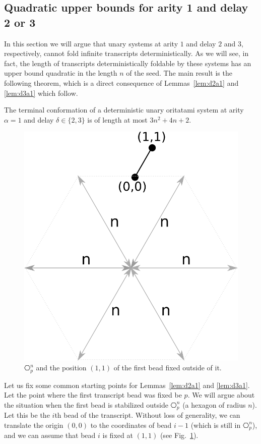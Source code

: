 

\subsection{Quadratic upper bounds for arity 1 and delay 2 or 3}
\label{sec:unary}

In this section we will argue that unary systems at arity $1$ and delay $2$ and $3$, respectively, cannot fold infinite transcripts deterministically. As we will see, in fact, the length of transcripts deterministically foldable by these systems has an upper bound quadratic in the length $n$ of the seed. The main result is the following theorem, which is a direct consequence of Lemmas~\ref{lem:d2a1}  and \ref{lem:d3a1} which follow.
\begin{theorem}[$\delta\in\{ 2,3\}, \alpha = 1$]\label{thm:d23a1}
	The terminal conformation of a deterministic unary oritatami system at arity $\alpha = 1$ and delay $\delta \in \{2,3\}$ is of length at most $3n^2+4n+2$.
\end{theorem}

\begin{figure}
	\centering
	\includegraphics[width=0.55\linewidth]{./Fig/hexagonOut}
	\caption{$\hexagon_p^n$ and the position $(1,1)$ of the first bead fixed outside of it.}
	\label{fig:hexagonOut}
\end{figure}

Let us fix some common starting points for Lemmas~\ref{lem:d2a1} and \ref{lem:d3a1}. Let the point where the first transcript bead was fixed be $p$. We will argue about the situation when the first bead is stabilized outside $\hexagon_p^n$ (a hexagon of radius $n$). Let this be the $i$th bead of the transcript. Without loss of generality, we can translate the origin $(0,0)$ to the coordinates of bead $i-1$ (which is still in $\hexagon_p^n$), and we can assume that bead $i$ is fixed at $(1,1)$ (see Fig.~\ref{fig:hexagonOut}).

